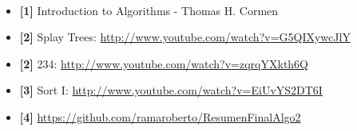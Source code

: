 \documentclass[10pt, a4paper]{report}
\begin{document}
~

\begin{itemize}
 \item \textbf{[1]} Introduction to Algorithms - Thomas H. Cormen
 \item \textbf{[2]} Splay Trees: \url{http://www.youtube.com/watch?v=G5QIXywcJlY}
 \item \textbf{[2]} 234: \url{http://www.youtube.com/watch?v=zqrqYXkth6Q}
 \item \textbf{[3]} Sort I: \url{http://www.youtube.com/watch?v=EiUvYS2DT6I}
 \item \textbf{[4]} \url{https://github.com/ramaroberto/ResumenFinalAlgo2}
\end{itemize}


\tableofcontents



\newpage



\newpage



\newpage


\end{document}
